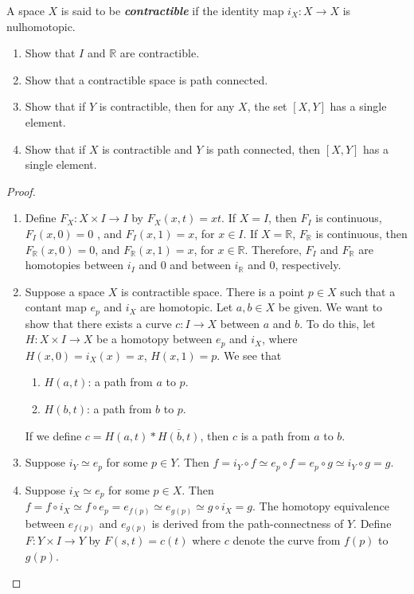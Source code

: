 \documentclass{article}
\begin{document}
\begin{multicols}{2}
\begin{exercise}
A space $X$ is said to be \textbf{\emph{contractible}} if the identity map $i_X:X\to X$ is nulhomotopic.
\begin{enumerate}[label={(\alph*)}]
\item Show that $I$ and $\mathbb{R}$ are contractible.
\item Show that a contractible space is path connected.
\item Show that if $Y$ is contractible, then for any $X$, the set $[X,Y]$ has a single element.
\item Show that if $X$ is contractible and $Y$ is path connected, then $[X,Y]$ has a single element.
\end{enumerate}
\end{exercise}
\begin{proof}
\begin{enumerate}[label={(\alph*)}]
\item Define $F_X:X\times I\to I$ by $F_X(x,t) = xt$. If $X=I$, then $F_I$ is continuous, $F_I(x,0) = 0$ , and $F_I(x,1) = x$, for $x\in I$. If $X=\mathbb{R}$, $F_{\mathbb{R}}$ is continuous, then $F_{\mathbb{R}}(x,0) = 0$, and $F_{\mathbb{R}}(x,1)=x$, for $x\in \mathbb{R}$. Therefore, $F_I$ and $F_{\mathbb{R}}$ are homotopies between $i_I$ and $0$ and between $i_{\mathbb{R}}$ and $0$, respectively.
\item Suppose a space $X$ is contractible space. There is a point $p\in X$ such that a contant map $e_p$ and $i_X$ are homotopic. Let $a,b\in X$ be given. We want to show that there exists a curve $c:I\to X$ between $a$ and $b$.  To do this, let $H:X\times I\to X$ be a homotopy between $e_p$ and $i_X$, where $H(x,0) = i_X(x) = x$, $H(x,1)=p$. We see that
\begin{enumerate}[label={(\alph*)}]
\item $H(a,t)$: a path from $a$ to $p$.
\item $H(b,t)$: a path from $b$ to $p$.
\end{enumerate}
If we define $c = H(a,t)*\overline{H(b,t)}$, then $c$ is a path from $a$ to $b$.
\item Suppose $i_Y\simeq e_p$ for some $p\in Y$. Then $f=i_Y\circ f\simeq e_p\circ f = e_p\circ g\simeq i_Y\circ g=g$.
\item Suppose $i_X\simeq e_p$ for some $p\in X$. Then $f=f\circ i_X\simeq f\circ e_p=e_{f(p)}\simeq e_{g(p)}\simeq g\circ i_X=g$. The homotopy equivalence between $e_{f(p)}$ and $e_{g(p)}$ is derived from the path-connectness of $Y$. Define $F:Y\times I\to Y$ by $F(s,t)=c(t)$ where $c$ denote the curve from $f(p)$ to $g(p)$.
\end{enumerate}
\end{proof}


\end{multicols}
\end{document}
